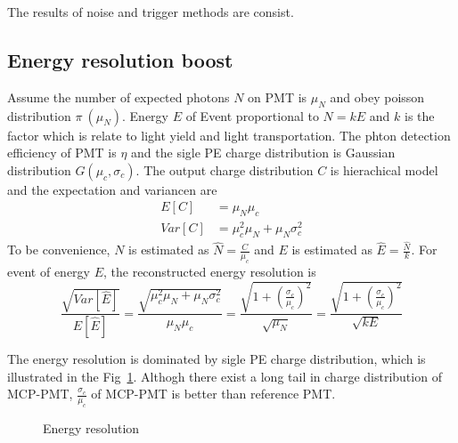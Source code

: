 The results of noise and trigger methods are consist.
\subsection{Energy resolution boost}
Assume the number of expected photons $N$ on PMT is $\mu_N$ and obey poisson distribution $\pi~(\mu_N)$. Energy $E$ of Event proportional to $N=kE$ and $k$ is the factor which is relate to light yield and light transportation. The phton detection efficiency of PMT is $\eta$ and the sigle PE charge distribution is Gaussian distribution $G(\mu_c,\sigma_c)$. The output charge distribution $C$ is hierachical model and the expectation and variancen are
\begin{align}
    E[C]&=\mu_N\mu_c\\
    Var[C]&=\mu_c^2\mu_N+\mu_N\sigma_c^2
\end{align}
To be convenience, $N$ is estimated as $\hat{N}=\frac{C}{\mu_c}$ and $E$ is estimated as $\hat{E}=\frac{\hat{N}}{k}$. For event of energy $E$, the reconstructed energy resolution is 
\begin{equation}
    \frac{\sqrt{Var[\hat{E}]}}{E[\hat{E}]}=\frac{\sqrt{\mu_c^2\mu_N+\mu_N\sigma_c^2}}{\mu_N\mu_c}=\frac{\sqrt{1+(\frac{\sigma_c}{\mu_c})^2}}{\sqrt{\mu_N}}=\frac{\sqrt{1+(\frac{\sigma_c}{\mu_c})^2}}{\sqrt{kE}}
\end{equation}

The energy resolution is dominated by sigle PE charge distribution, which is illustrated in the Fig~\ref{fig:EnergyResolution}. Althogh there exist a long tail in charge distribution of MCP-PMT, $\frac{\sigma_c}{\mu_c}$ of MCP-PMT is better than reference PMT.
\begin{figure}[!htbp]
    \centering
    \caption{Energy resolution}
    \label{fig:EnergyResolution}
\end{figure}